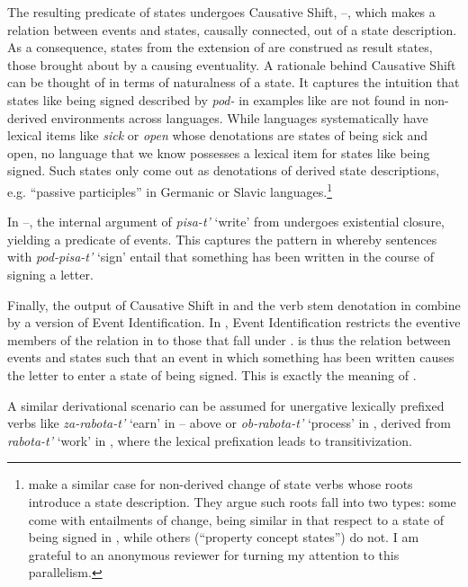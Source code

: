 \documentclass[output=paper,colorlinks,citecolor=brown]{langscibook}
\begin{document}
The resulting predicate of states undergoes Causative Shift, --, which makes a relation between events and states, causally connected, out of a state description. As a consequence, states from the extension of  are construed as result states, those brought about by a causing eventuality. A rationale behind Causative Shift can be thought of in terms of naturalness of a state. It captures the intuition that states like being signed described by \textit{pod-} in examples like  are not found in non-derived environments across languages. While languages systematically have lexical items like \textit{sick} or \textit{open} whose denotations are states of being sick and open, no language that we know possesses a lexical item for states like being signed. Such states only come out as denotations of derived state descriptions, e.g. “passive participles” in Germanic or Slavic languages.\footnote{\citet[and subsequent work]{KoontzGarboden.Beavers2017} make a similar case for non-derived change of state verbs whose roots introduce a state description. They argue such roots fall into two types: some come with entailments of change, being similar in that respect to a state of being signed in , while others (“property concept states”) do not. I am grateful to an anonymous reviewer for turning my attention to this parallelism.}

In --, the internal argument of \textit{pisa-t’} ‘write’ from  undergoes existential closure, yielding a predicate of events. This captures the pattern in  whereby sentences with \textit{pod-pisa-t’} ‘sign’ entail that something has been written in the course of signing a letter.

Finally, the output of Causative Shift in  and the verb stem denotation in  combine by a version of  Event Identification. In , Event Identification restricts the eventive members of the relation in  to those that fall under .  is thus the relation between events and states such that an event in which something has been written causes the letter to enter a state of being signed. This is exactly the meaning of .

A similar derivational scenario can be assumed for unergative lexically prefixed verbs like \textit{za-rabota-t’} ‘earn’ in -- above or \textit{ob-rabota-t'} ‘process’ in , derived from \textit{rabota-t'} ‘work’ in , where the lexical prefixation leads to transitivization.
\end{document}
